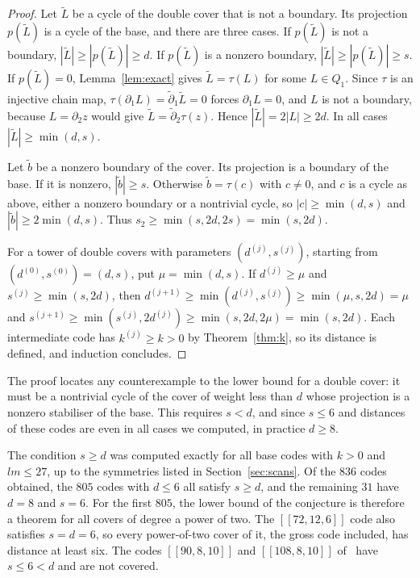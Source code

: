 \documentclass[11pt,a4paper]{article}
\theoremstyle{definition}
\theoremstyle{plain}
\newcommand{\code}[1]{[\![#1]\!]}
\begin{document}
\begin{proof}
Let $\tilde L$ be a cycle of the double cover that is not a boundary. Its
projection $p(\tilde L)$ is a cycle of the base, and there are three cases.
If $p(\tilde L)$ is not a boundary, $|\tilde L|\ge|p(\tilde L)|\ge d$. If
$p(\tilde L)$ is a nonzero boundary, $|\tilde L|\ge|p(\tilde L)|\ge s$. If
$p(\tilde L)=0$, Lemma~\ref{lem:exact} gives $\tilde L=\tau(L)$ for some
$L\in Q_1$. Since $\tau$ is an injective chain map,
$\tau(\partial_1L)=\tilde\partial_1\tilde L=0$ forces $\partial_1L=0$, and
$L$ is not a boundary, because $L=\partial_2z$ would give
$\tilde L=\tilde\partial_2\tau(z)$. Hence $|\tilde L|=2|L|\ge2d$. In all cases
$|\tilde L|\ge\min(d,s)$.

Let $\tilde b$ be a nonzero boundary of the cover. Its projection is a
boundary of the base. If it is nonzero, $|\tilde b|\ge s$. Otherwise
$\tilde b=\tau(c)$ with $c\ne0$, and $c$ is a cycle as above, either a
nonzero boundary or a nontrivial cycle, so $|c|\ge\min(d,s)$ and
$|\tilde b|\ge2\min(d,s)$. Thus $s_2\ge\min(s,2d,2s)=\min(s,2d)$.

For a tower of double covers with parameters $(d^{(j)},s^{(j)})$, starting
from $(d^{(0)},s^{(0)})=(d,s)$, put $\mu=\min(d,s)$. If $d^{(j)}\ge\mu$ and
$s^{(j)}\ge\min(s,2d)$, then
$d^{(j+1)}\ge\min(d^{(j)},s^{(j)})\ge\min(\mu,s,2d)=\mu$ and
$s^{(j+1)}\ge\min(s^{(j)},2d^{(j)})\ge\min(s,2d,2\mu)=\min(s,2d)$. Each
intermediate code has $k^{(j)}\ge k>0$ by Theorem~\ref{thm:k}, so its
distance is defined, and induction concludes.
\end{proof}

The proof locates any counterexample to the lower bound for a double cover:
it must be a nontrivial cycle of the cover of weight less than $d$ whose
projection is a nonzero stabiliser of the base. This requires $s<d$, and since
$s\le6$ and distances of these codes are even in all cases we computed, in
practice $d\ge8$.

The condition $s\ge d$ was computed exactly for all base codes with $k>0$ and
$lm\le27$, up to the symmetries listed in Section~\ref{sec:scans}. Of the
$836$ codes obtained, the $805$ codes with $d\le6$ all satisfy $s\ge d$, and the
remaining $31$ have $d=8$ and $s=6$. For the first $805$, the lower bound of the
conjecture is therefore a theorem for all covers of degree a power of two. The
$\code{72,12,6}$ code also satisfies $s=d=6$, so every power-of-two cover of it,
the gross code included, has distance at least six. The codes
$\code{90,8,10}$ and $\code{108,8,10}$ of~\cite{Bravyi2024} have $s\le6<d$ and
are not covered.
\end{document}
